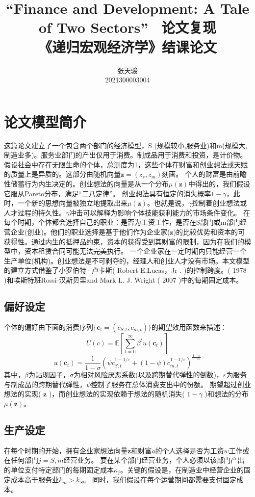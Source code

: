 \documentclass[a4paper, 12pt]{ctexart}
\author{张天骏 \\ 2021300003004}
\date{}
\title{“Finance and Development: A Tale of Two Sectors” \ 论文复现  \\  \large《递归宏观经济学》结课论文}
\begin{document}
\maketitle


\section{论文模型简介}
这篇论文建立了一个包含两个部门的经济模型，S (规模较小,服务业)和m(规模大,制造业多)。服务业部门的产出仅用于消费。制成品用于消费和投资，是计价物。
假设社会中存在无限生命的个体，总测度为1，这些个体在财富和创业想法或天赋的质量上是异质的。这部分由随机向量$\mathbf{z}=(z_s,z_m)$刻画。
个人的财富是由前瞻性储蓄行为内生决定的。创业想法的向量是从一个分布$\mu(\mathbf{z})$中得出的，我们假设它服从Pareto分布，满足“二八定律”。
创业想法具有恒定的消失概率$1-\gamma$，此时，一个新的思想向量被独立地提取出来$\mu(\mathbf{z})$。也就是说，$\gamma$控制着创业想法或人才过程的持久性。$\gamma$冲击可以解释为影响个体技能获利能力的市场条件变化。
在每个时期，个体都会选择自己的职业：是否为工资工作，是否在S部门或m部门经营企业(创业)。他们的职业选择是基于他们作为企业家($\mathbf{z}$)的比较优势和资本的可获得性。通过内生的抵押品约束，资本的获得受到其财富的限制，因为在我们的模型中，资本租赁合同可能无法完美执行。
一个企业家在一定时期内只能经营一个生产单位(机构)。创业想法是不可剥夺的，经理人和创业人才没有市场。本文模型的建立方式借鉴了小罗伯特·卢卡斯( Robert E.Lucas，Jr . )的控制跨度。( 1978 )和埃斯特班Rossi-汉斯贝里and Mark L. J. Wright ( 2007 )中的每期固定成本。
\subsection{偏好设定}
个体的偏好由下面的消费序列$\{\mathbf{c}_t=(c_{S,t},c_{m,t})\}$的期望效用函数来描述：
$$U(c)=\mathbb{E} [\sum_{t=0}^{\infty} \beta^t u(\mathbf{c}_t)]$$
$$u(\mathbf{c}_t) = \frac{1}{1-\sigma}(\psi c_{S,t}^{1-1/\varepsilon} + (1-\psi)c_{m,t}^{1-1/\varepsilon})^{\frac{1-\sigma}{^{1-1/\varepsilon}}}$$
其中，$\beta$为贴现因子，$\sigma$为相对风险厌恶系数(以及跨期替代弹性的倒数)，$\varepsilon$为服务与制成品的跨期替代弹性，$\psi$控制了服务在总体消费支出中的份额。
期望超过创业想法的实现( $\mathbf{z}$ )，而创业想法的实现依赖于想法的随机消失( $1-\gamma$ )和想法的分布$\mu(\mathbf{z})$。
\subsection{生产设定}
在每个时期的开始，拥有企业家想法向量$\mathbf{z}$和财富$a$的个人选择是否为工资$w$工作或在任何部门$j = S,m$经营业务。
要在某个部门经营业务，个人必须以该部门产出的单位支付特定部门的每期固定成本$κ_j$。关键的假设是，在制造业中经营企业的固定成本高于服务业$k_m > k_S$。
同时，我们假设在每个运营期间都需要支付固定成本。
\end{document}

